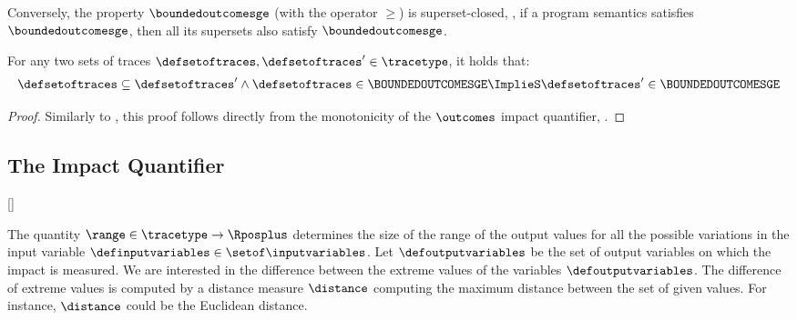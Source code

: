 Conversely, the property $\boundedoutcomesge$ (with the operator $\ge$) is superset-closed, \ie, if a program semantics satisfies $\boundedoutcomesge$, then all its supersets also satisfy $\boundedoutcomesge$.

\begin{lemma}
  For any two sets of traces $\defsetoftraces, \defsetoftraces'\in\tracetype$, it holds that:
  \begin{gather*}
    \defsetoftraces \subseteq \defsetoftraces' \land \defsetoftraces \in \BOUNDEDOUTCOMESGE \ImplieS \defsetoftraces' \in \BOUNDEDOUTCOMESGE
  \end{gather*}
\end{lemma}
\begin{proof}
  Similarly to , this proof follows directly from the monotonicity of the $\outcomes$ impact quantifier, \cf{} .
\end{proof}

\subsection{The \rangename{} Impact Quantifier}[\rangename]

The quantity $\range\in\tracetype\to\Rposplus$ determines the
size of the range of the output values for all the possible variations in the input variable $\definputvariables\in\setof\inputvariables$.
Let $\defoutputvariables$ be the set of output variables on which the impact is measured.
We are interested in the difference between the extreme values of the variables $\defoutputvariables$.
The difference of extreme values is computed by a distance measure $\distance$ computing the maximum distance between the set of given values. For instance, $\distance$ could be the Euclidean distance.

